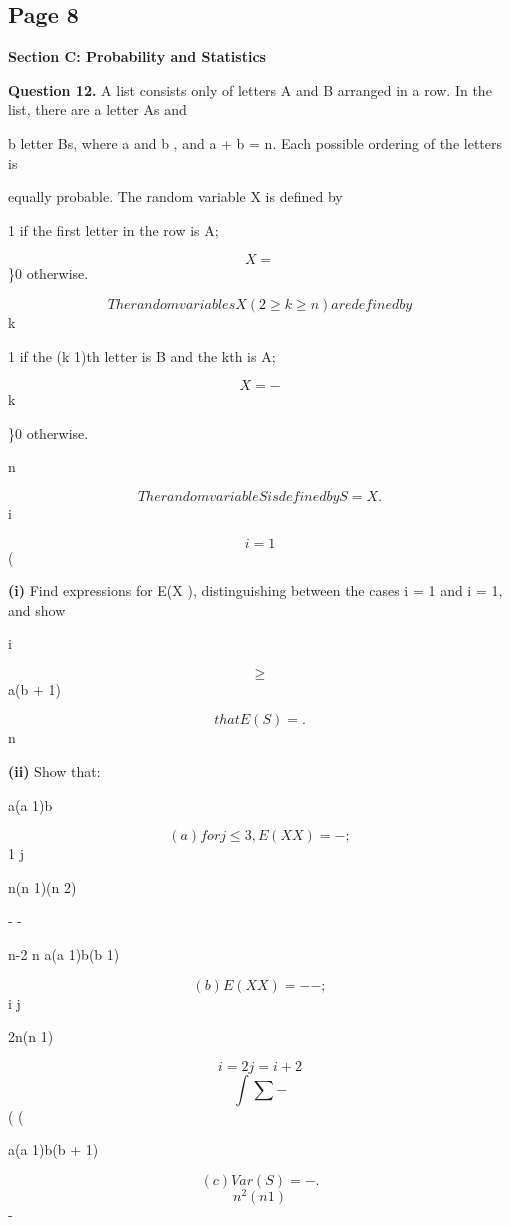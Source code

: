 \documentclass[12pt]{article}
\begin{document}
\subsection*{Page 8}
\begin{flushleft}
\bigskip\textbf{Section C: Probability and Statistics}\par
\bigskip\textbf{Question 12.} A list consists only of letters A and B arranged in a row. In the list, there are a letter As and\par
b letter Bs, where a  and b , and a + b = n. Each possible ordering of the letters is\par
equally probable. The random variable X is defined by\par
1 if the first letter in the row is A;\par
\[X =\]
\}0 otherwise.\par
\[The random variables X (2 \geq k \geq n) are defined by\]
k\par
1 if the (k 1)th letter is B and the kth is A;\par
\[X = -\]
k\par
\}0 otherwise.\par
n\par
\[The random variable S is defined by S = X .\]
i\par
\[i=1\]
(\par
\textbf{(i)} Find expressions for E(X ), distinguishing between the cases i = 1 and i = 1, and show\par
i\par
\[\geq\]
a(b + 1)\par
\[that E(S) = .\]
n\par
\textbf{(ii)} Show that:\par
a(a 1)b\par
\[(a) for j \leq 3, E(X X ) = - ;\]
1 j\par
n(n 1)(n 2)\par
- -\par
n-2 n a(a 1)b(b 1)\par
\[(b) E(X X ) = - - ;\]
i j\par
2n(n 1)\par
\[i=2 j=i+2\]
\[\int \sum -\]
( (\par
a(a 1)b(b + 1)\par
\[(c) Var (S) = - .\]
\[n^2(n 1)\]
-\par
\end{flushleft}
\end{document}
